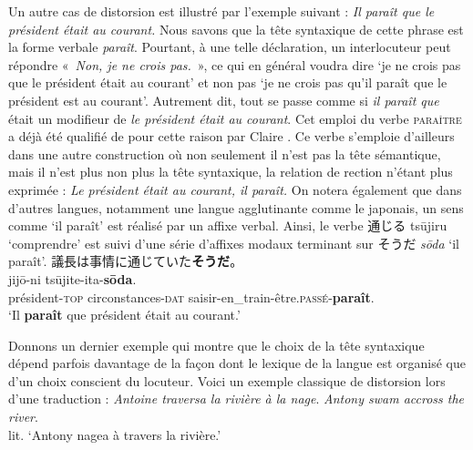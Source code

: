 {    Un autre cas de distorsion est illustré par l’exemple suivant :
    \ea
    \textit{{Il paraît que le président était au courant.}}
    \z
    Nous savons que la tête syntaxique de cette phrase est la forme verbale \textit{paraît}. Pourtant, à une telle déclaration, un interlocuteur peut répondre «~\textit{Non, je ne crois pas.}~», ce qui en général voudra dire ‘je ne crois pas que le président était au courant’ et non pas ‘je ne crois pas qu’il paraît que le président est au courant’. Autrement dit, tout se passe comme si \textit{il paraît que} était un modifieur de \textit{le président était au courant}. Cet emploi du verbe \textsc{paraître} a déjà été qualifié de  pour cette raison par Claire \citet{blanche-benveniste1989constructions}. Ce verbe s’emploie d’ailleurs dans une autre construction où non seulement il n’est pas la tête sémantique, mais il n’est plus non plus la tête syntaxique, la relation de rection n’étant plus exprimée :
    \ea
    \textit{{Le président était au courant, il paraît.}}
    \z
    On notera également que dans d’autres langues, notamment une langue agglutinante comme le japonais, un sens comme ‘il paraît’ est réalisé par un affixe verbal. Ainsi, le verbe {\cjkfont 通じる} tsūjiru ‘comprendre’ est suivi d’une série d’affixes modaux terminant sur {\cjkfont そうだ} \textit{sōda} ‘il paraît’.
    \ea\relax
    {\cjkfont 議長は事情に通じていた\textbf{そうだ}。}\\
      {jijō-ni}  {tsūjite-ita-\textbf{sōda}}.\\
    président-\textsc{top} circonstances-\textsc{dat} saisir-en\_train-être.\textsc{passé}-\textbf{paraît}.\\
    \glt ‘Il \textbf{paraît} que président était au courant.’
    \z

    Donnons un dernier exemple qui montre que le choix de la tête syntaxique dépend parfois davantage de la façon dont le lexique de la langue est organisé que d’un choix conscient du locuteur. Voici un exemple classique de distorsion lors d’une traduction :
    \ea
    \ea\textit{Antoine traversa la rivière à la nage}.
    \ex\textit{Antony swam accross the river}.\\
    lit. `Antony nagea à travers la rivière.'\z
    \z

}
